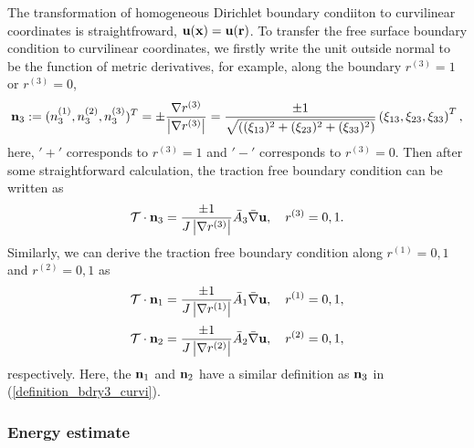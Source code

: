 \documentclass[a4paper]{article}
\begin{document}
The transformation of homogeneous Dirichlet boundary condiiton to curvilinear coordinates is straightfroward, ${\bf u}({\bf x}) = {\bf u}(\bf r)$. To transfer the free surface boundary condition to curvilinear coordinates, we firstly write the unit outside normal to be the function of metric derivatives, for example, along the boundary $r^{(3)} = 1$ or $r^{(3)} = 0$,
\begin{equation}\label{definition_bdry3_curvi}
{\bf n}_3 := (n^{(1)}_3,n^{(2)}_3,n^{(3)}_3)^T = \pm \frac{\nabla r^{(3)}}{\left|\nabla r^{(3)}\right|} = \frac{\pm 1}{\sqrt{((\xi_{13})^2+(\xi_{23})^2+(\xi_{33})^2)}}\left(\xi_{13},\xi_{23},\xi_{33}\right)^T,
\end{equation}
here, $'+'$ corresponds to $r^{(3)} = 1$ and $'-'$ corresponds to $r^{(3)} = 0$. Then after some straightforward calculation, the traction free boundary condition can be written as
\begin{equation}\label{bdry3_curvi}
\mathcal{T}\cdot{\bf n}_3 = \frac{\pm 1}{J\left|\nabla r^{(3)}\right|}\bar{A}_3\bar{\nabla}{\bf u}, \ \ \ r^{(3)} = 0, 1.
\end{equation}
Similarly, we can derive the traction free boundary condition along $r^{(1)} = 0,1$ and $r^{(2)} = 0,1$ as
\begin{equation}\label{bdry1_curvi}
\mathcal{T}\cdot{\bf n}_1 = \frac{\pm 1}{J\left|\nabla r^{(1)}\right|}\bar{A}_1\bar{\nabla}{\bf u}, \ \ \ r^{(1)} = 0, 1,
\end{equation}
\begin{equation}\label{bdry2_curvi}
\mathcal{T}\cdot{\bf n}_2 = \frac{\pm 1}{J\left|\nabla r^{(2)}\right|}\bar{A}_2\bar{\nabla}{\bf u}, \ \ \ r^{(2)} = 0, 1,
\end{equation} 
respectively. Here, the ${\bf n}_1$ and ${\bf n}_2$ have a similar definition as ${\bf n}_3$ in (\ref{definition_bdry3_curvi}).

\subsubsection{Energy estimate}
\end{document}

